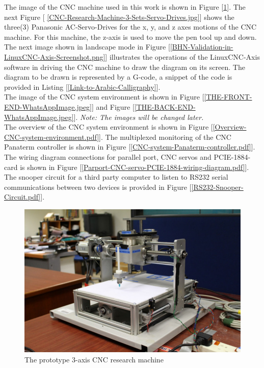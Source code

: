 The image of the CNC machine used in this work is shown in Figure [\ref{CNC-Research-Machine-3-Axis.jpg}]. The next Figure [	\ref{CNC-Research-Machine-3-Sets-Servo-Drives.jpg}] shows the three(3) Panasonic AC-Servo-Drives for the x, y, and z axes motions of the CNC machine. For this machine, the z-axis is used to move the pen tool up and down.\\ 

The next image shown in landscape mode in Figure [\ref{BHN-Validation-in-LinuxCNC-Axis-Screenshot.png}] illustrates the operations of the LinuxCNC-Axis software in driving the CNC machine to draw the diagram on its screen. The diagram to be drawn is represented by a G-code, a snippet of the code is provided in Listing [\ref{Link-to-Arabic-Calligraphy}]. \\

The image of the CNC system environment is shown in Figure [\ref{THE-FRONT-END-WhatsAppImage.jpeg}] and Figure [\ref{THE-BACK-END-WhatsAppImage.jpeg}]. \textit{Note: The images will be changed later.}\\


The overview of the CNC system environment is shown in Figure [\ref{Overview-CNC-system-environment.pdf}]. The multiplexed monitoring of the CNC Panaterm controller is shown in Figure [\ref{CNC-system-Panaterm-controller.pdf}]. The wiring diagram connections for parallel port, CNC servos and PCIE-1884-card is shown in Figure [\ref{Parport-CNC-servo-PCIE-1884-wiring-diagram.pdf}]. The snooper circuit for a third party computer to listen to RS232 serial communications between two devices is provided in Figure 	[\ref{RS232-Snooper-Circuit.pdf}].\\



\clearpage
\pagebreak

\begin{figure}
	\centering
	\includegraphics[width=1.00\textwidth]{Images/Chap4/CNC/CNC-Research-Machine-3-Axis.jpg} 
	\caption{The prototype 3-axis CNC research machine}
	\label{CNC-Research-Machine-3-Axis.jpg}
\end{figure}

